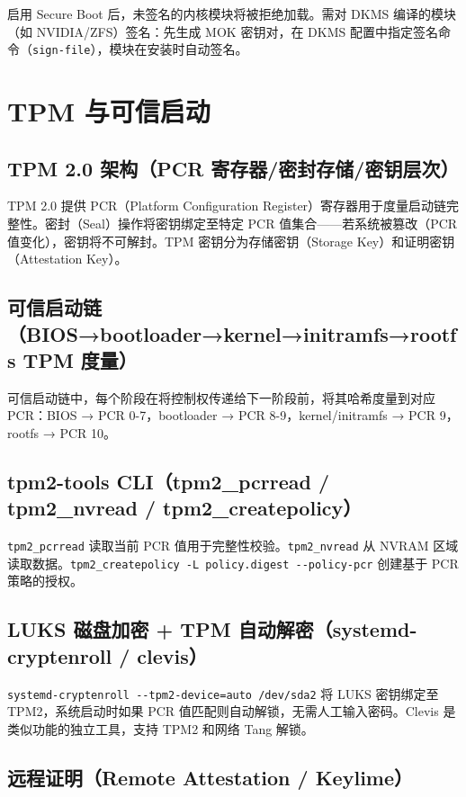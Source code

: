 \documentclass[12pt,UTF8]{ctexbook}
\begin{document}
启用 Secure Boot 后，未签名的内核模块将被拒绝加载。需对 DKMS 编译的模块（如 NVIDIA/ZFS）签名：先生成 MOK 密钥对，在 DKMS 配置中指定签名命令（\verb|sign-file|），模块在安装时自动签名。

  \section{TPM 与可信启动}
    \subsection{TPM 2.0 架构（PCR 寄存器/密封存储/密钥层次）}

TPM 2.0 提供 PCR（Platform Configuration Register）寄存器用于度量启动链完整性。密封（Seal）操作将密钥绑定至特定 PCR 值集合——若系统被篡改（PCR 值变化），密钥将不可解封。TPM 密钥分为存储密钥（Storage Key）和证明密钥（Attestation Key）。

    \subsection{可信启动链（BIOS→bootloader→kernel→initramfs→rootfs TPM 度量）}

可信启动链中，每个阶段在将控制权传递给下一阶段前，将其哈希度量到对应 PCR：BIOS → PCR 0-7，bootloader → PCR 8-9，kernel/initramfs → PCR 9，rootfs → PCR 10。

    \subsection{tpm2-tools CLI（tpm2\_pcrread / tpm2\_nvread / tpm2\_createpolicy）}

\verb|tpm2_pcrread| 读取当前 PCR 值用于完整性校验。\verb|tpm2_nvread| 从 NVRAM 区域读取数据。\verb|tpm2_createpolicy -L policy.digest --policy-pcr| 创建基于 PCR 策略的授权。

    \subsection{LUKS 磁盘加密 + TPM 自动解密（systemd-cryptenroll / clevis）}

\verb|systemd-cryptenroll --tpm2-device=auto /dev/sda2| 将 LUKS 密钥绑定至 TPM2，系统启动时如果 PCR 值匹配则自动解锁，无需人工输入密码。Clevis 是类似功能的独立工具，支持 TPM2 和网络 Tang 解锁。

    \subsection{远程证明（Remote Attestation / Keylime）}
\end{document}
